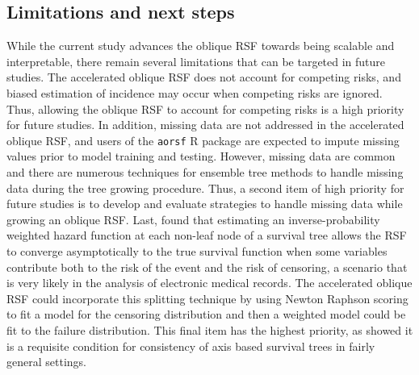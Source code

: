\documentclass[twoside,11pt]{article}\usepackage[]{graphicx}\usepackage[]{xcolor}
\begin{document}
\subsection{Limitations and next steps}

While the current study advances the oblique RSF towards being scalable and interpretable, there remain several limitations that can be targeted in future studies. The accelerated oblique RSF does not account for competing risks, and biased estimation of incidence may occur when competing risks are ignored. Thus, allowing the oblique RSF to account for competing risks is a high priority for future studies. In addition, missing data are not addressed in the accelerated oblique RSF, and users of the \texttt{aorsf} R package are expected to impute missing values prior to model training and testing. However, missing data are common and there are numerous techniques for ensemble tree methods to handle missing data during the tree growing procedure. Thus, a second item of high priority for future studies is to develop and evaluate strategies to handle missing data while growing an oblique RSF. Last, \citet{cui2017consistency} found that estimating an inverse-probability weighted hazard function at each non-leaf node of a survival tree allows the RSF to converge asymptotically to the true survival function when some variables contribute both to the risk of the event and the risk of censoring, a scenario that is very likely in the analysis of electronic medical records. The accelerated oblique RSF could incorporate this splitting technique by using Newton Raphson scoring to fit a model for the censoring distribution and then a weighted model could be fit to the failure distribution. This final item has the highest priority, as \citet{cui2017consistency} showed it is a requisite condition for consistency of axis based survival trees in fairly general settings.



\end{document}
